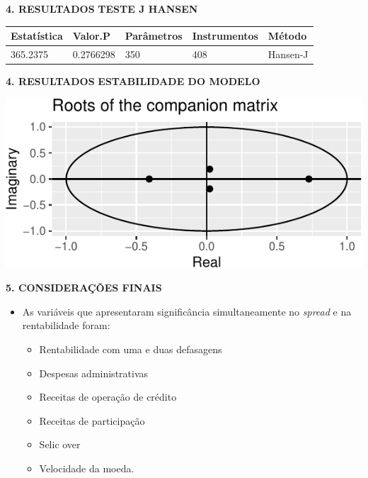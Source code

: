 \documentclass[
  ignorenonframetext,
  aspectratio=169,
  ignorenonframetext]{beamer}
\providecommand{\tightlist}{%
  \setlength{\itemsep}{0pt}\setlength{\parskip}{0pt}}
\begin{document}
\begin{frame}{\textbf{4. RESULTADOS}}
\protect\hypertarget{resultados-5}{}
\textbf{TESTE J HANSEN}

\begin{longtable}[]{@{}lllll@{}}
\toprule
Estatística & Valor.P & Parâmetros & Instrumentos & Método \\
\midrule
\endhead
365.2375 & 0.2766298 & 350 & 408 & Hansen-J \\
\bottomrule
\end{longtable}
\end{frame}

\begin{frame}{\textbf{4. RESULTADOS}}
\protect\hypertarget{resultados-6}{}
\textbf{ESTABILIDADE DO MODELO}

\begin{center}\includegraphics{02-final_presentation-V1_files/figure-beamer/stability.plot-1} \end{center}
\end{frame}

\begin{frame}{\textbf{5. CONSIDERAÇÕES FINAIS}}
\protect\hypertarget{considerauxe7uxf5es-finais}{}
\begin{itemize}
\tightlist
\item
  As variáveis que apresentaram significância simultaneamente no
  \emph{spread} e na rentabilidade foram:

  \begin{itemize}
  \tightlist
  \item
    Rentabilidade com uma e duas defasagens
  \item
    Despesas administrativas
  \item
    Receitas de operação de crédito
  \item
    Receitas de participação
  \item
    Selic over
  \item
    Velocidade da moeda.
  \end{itemize}
\end{itemize}
\end{frame}
\end{document}
